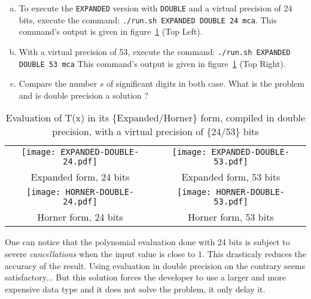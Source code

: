 \begin{question}
\begin{enumerate}[(a)]
\item To execute the {\tt EXPANDED} version with {\tt DOUBLE} and a virtual precision of 24 bits, execute the command: {\tt ./run.sh EXPANDED
      DOUBLE 24 mca}. \newline This command's output is given in figure~\ref{fig:exp_hor_24_53} (Top Left).
  \item With a virtual precision of 53, execute the command: {\tt ./run.sh EXPANDED DOUBLE 53 mca} \newline
  This command's output is given in figure~\ref{fig:exp_hor_24_53} (Top Right).
  \item Compare the number $s$ of significant digits in both case. What is the problem and is double precision a solution ?  
  \end{enumerate}
\end{question}

\begin{table}
\begin{tabular}{cc}
\texttt{[image: EXPANDED-DOUBLE-24.pdf]} &
\texttt{[image: EXPANDED-DOUBLE-53.pdf]} \\
Expanded form, 24 bits & Expanded form, 53 bits \\ 
\texttt{[image: HORNER-DOUBLE-24.pdf]} &
\texttt{[image: HORNER-DOUBLE-53.pdf]} \\
Horner form, 24 bits & Horner form, 53 bits \\
\end{tabular}
  \caption{Evaluation of T(x) in its \{Expanded/Horner\} form, compiled in double precision, with a virtual precision of \{24/53\} bits}
  \label{fig:exp_hor_24_53}
\end{table}


One can notice that the polynomial evaluation done with 24 bits is subject to severe {\it cancellations} when the input value is close to $1$.
This drasticaly reduces the accuracy of the result.
Using evaluation in double precision on the contrary seems satisfactory...
But this solution forces the developer to use a larger and more expensive data type and it does not solve the problem, it only delay it. 

